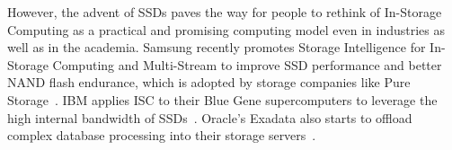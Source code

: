 



However, the advent of SSDs paves the way for people to rethink of In-Storage Computing as a practical and promising computing model even in industries as well as in the academia. Samsung recently promotes Storage Intelligence for In-Storage Computing and Multi-Stream to improve SSD performance and better NAND flash endurance, which is adopted by storage companies like Pure Storage~\cite{StorageIntelligence:Samsung:PureStorage}. IBM applies ISC to their Blue Gene supercomputers to leverage the high internal bandwidth of SSDs~\cite{IBM:BlueGene:2013}. Oracle's Exadata also starts to offload complex database processing into their storage servers~\cite{Exadata:Oracle:2010}. 

